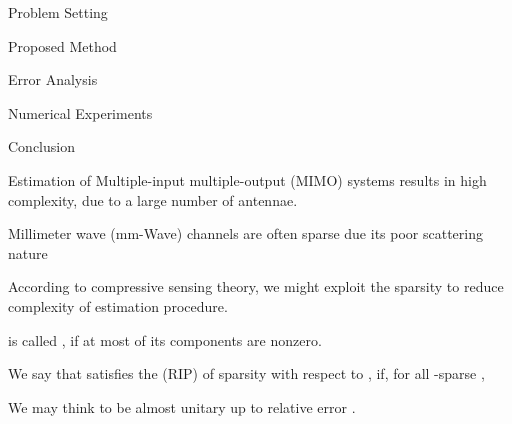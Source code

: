 

\Title {\TitleText}
\blank [big]

\Subtitle {\AuthorText}
\blank [big]

\Subsubtitle {\InstitutionText}

\page [yes]
{
\I Problem Setting

\I Proposed Method

\I Error Analysis

\I Numerical Experiments

\I Conclusion
}
{
\I Estimation of Multiple-input multiple-output (MIMO) systems results in high complexity, due to a large number of antennae.

\I Millimeter wave (mm-Wave) channels are often sparse due its poor scattering nature

\I According to compressive sensing theory, we might exploit the sparsity to reduce complexity of estimation procedure.
}
{
\I {} is called , if at most  of its components are nonzero.

\I We say that  satisfies the  (RIP) of sparsity  with respect to , if, for all -sparse ,

\I We may think  to be almost unitary up to relative error .
}


